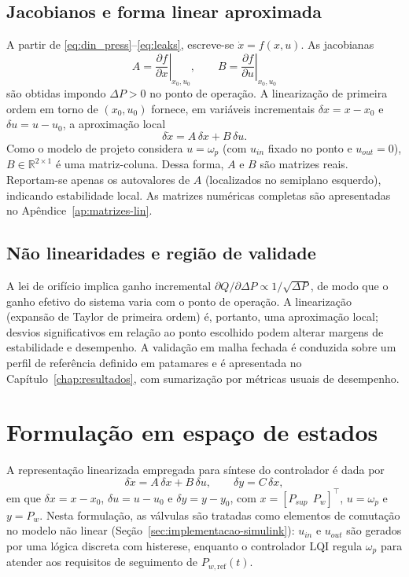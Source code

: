\subsection{Jacobianos e forma linear aproximada}
\label{sec:derivacao-matrizes-jacobianas}
A partir de \eqref{eq:din_press}–\eqref{eq:leaks}, escreve-se $\dot{x}=f(x,u)$. As jacobianas
\[
    A=\left.\frac{\partial f}{\partial x}\right|_{x_0,u_0},
    \qquad
    B=\left.\frac{\partial f}{\partial u}\right|_{x_0,u_0}
\]
são obtidas impondo $\Delta P>0$ no ponto de operação. A linearização de primeira ordem em torno de $(x_0,u_0)$ fornece, em variáveis incrementais $\delta x = x-x_0$ e $\delta u = u-u_0$, a aproximação local
\[
    \delta\dot{x} = A\,\delta x + B\,\delta u.
\]
Como o modelo de projeto considera $u=\omega_p$ (com $u_{in}$ fixado no ponto e $u_{out}=0$), $B\in\mathbb{R}^{2\times 1}$ é uma matriz-coluna. Dessa forma, $A$ e $B$ são matrizes reais. Reportam-se apenas os autovalores de $A$ (localizados no semiplano esquerdo), indicando estabilidade local. As matrizes numéricas completas são apresentadas no Apêndice~\ref{ap:matrizes-lin}.
\subsection{Não linearidades e região de validade}
A lei de orifício implica ganho incremental $\partial Q/\partial \Delta P \propto 1/\sqrt{\Delta P}$, de modo que o ganho efetivo do sistema varia com o ponto de operação. A linearização (expansão de Taylor de primeira ordem) é, portanto, uma aproximação local; desvios significativos em relação ao ponto escolhido podem alterar margens de estabilidade e desempenho. A validação em malha fechada é conduzida sobre um perfil de referência definido em patamares e é apresentada no Capítulo~\ref{chap:resultados}, com sumarização por métricas usuais de desempenho.
\section{Formulação em espaço de estados}
\label{sec:controle-formulacao-espaço-estados}
A representação linearizada empregada para síntese do controlador é dada por
\[
    \delta\dot{x} = A\,\delta x + B\,\delta u, \qquad \delta y = C\,\delta x,
\]
em que $\delta x = x-x_0$, $\delta u = u-u_0$ e $\delta y = y-y_0$, com $x=[P_{sup}\ \ P_w]^\top$, $u=\omega_p$ e $y=P_w$. Nesta formulação, as válvulas são tratadas como elementos de comutação no modelo não linear (Seção~\ref{sec:implementacao-simulink}): $u_{in}$ e $u_{out}$ são gerados por uma lógica discreta com histerese, enquanto o controlador LQI regula $\omega_p$ para atender aos requisitos de seguimento de $P_{w,\text{ref}}(t)$.
